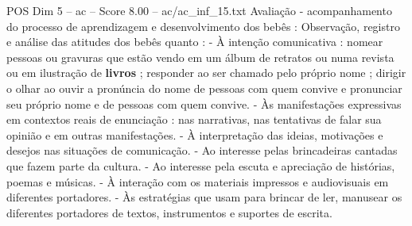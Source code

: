 \begin{textsample}{POS Dim 5 – ac – Score 8.00 – ac/ac\_inf\_15.txt}
Avaliação - acompanhamento do processo de aprendizagem e desenvolvimento dos bebês : Observação, registro e análise das atitudes dos bebês quanto : - À intenção comunicativa : nomear pessoas ou gravuras que estão vendo em um álbum de retratos ou numa revista ou em ilustração de \textbf{livros} ; responder ao ser chamado pelo próprio nome ; dirigir o olhar ao ouvir a pronúncia do nome de pessoas com quem convive e pronunciar seu próprio nome e de pessoas com quem convive. - Às manifestações expressivas em contextos reais de enunciação : nas narrativas, nas tentativas de falar sua opinião e em outras manifestações. - À interpretação das ideias, motivações e desejos nas situações de comunicação. - Ao interesse pelas brincadeiras cantadas que fazem parte da cultura. - Ao interesse pela escuta e apreciação de histórias, poemas e músicas. - À interação com os materiais impressos e audiovisuais em diferentes portadores. - Às estratégias que usam para brincar de ler, manusear os diferentes portadores de textos, instrumentos e suportes de escrita.

\end{textsample}
